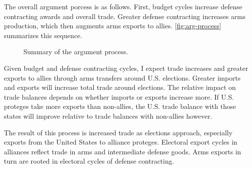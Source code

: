 \documentclass[12pt]{article}
\begin{document}
The overall argument porcess is as follows.
First, budget cycles increase defense contracting awards and overall trade. 
Greater defense contracting increases arms production, which then augments arms exports to allies.
\autoref{fig:arg-process} summarizes this sequence.


\begin{figure}[htpb]
\caption{Summary of the argument process.}
\label{fig:arg-process}
\end{figure}




Given budget and defense contracting cycles, I expect trade increases and greater exports to allies through arms transfers around U.S. elections.
Greater imports and exports will increase total trade around elections. 
The relative impact on trade balances depends on whether imports or exports increase more. 
If U.S. proteges take more exports than non-allies, the U.S. trade balance with those states will improve relative to trade balances with non-allies however.


The result of this process is increased trade as elections approach, especially exports from the United States to alliance proteges.
Electoral export cycles in alliances reflect trade in arms and intermediate defense goods. 
Arms exports in turn are rooted in electoral cycles of defense contracting.
\end{document}

